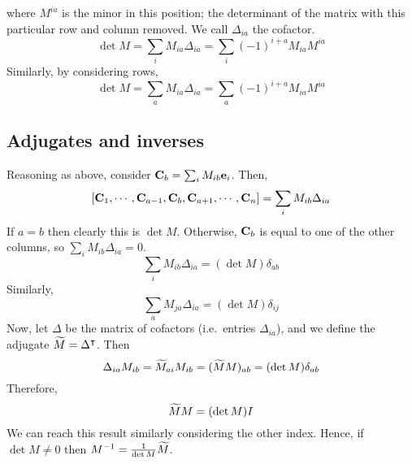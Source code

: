 where \(M^{ia}\) is the minor in this position; the determinant of the matrix with this particular row and column removed.
We call \(\Delta_{ia}\) the cofactor.
\[
	\det M = \sum_i M_{ia} \Delta_{ia} = \sum_i(-1)^{i+a}M_{ia}M^{ia}
\]
Similarly, by considering rows,
\[
	\det M = \sum_a M_{ia} \Delta_{ia} = \sum_a(-1)^{i+a}M_{ia}M^{ia}
\]

\subsection{Adjugates and inverses}
Reasoning as above, consider \(\vb C_b = \sum_i M_{ib} \vb e_i\).
Then,
\[
	[\vb C_1, \cdots, \vb C_{a-1}, \vb C_b, \vb C_{a+1}, \cdots, \vb C_n ] = \sum_i M_{ib} \Delta_{ia}
\]
If \(a=b\) then clearly this is \(\det M\).
Otherwise, \(\vb C_b\) is equal to one of the other columns, so \(\sum_i M_{ib} \Delta_{ia} = 0\).
\[
	\sum_i M_{ib} \Delta_{ia} = (\det M)\delta_{ab}
\]
Similarly,
\[
	\sum_a M_{ja} \Delta_{ia} = (\det M)\delta_{ij}
\]
Now, let \(\Delta\) be the matrix of cofactors (i.e.\ entries \(\Delta_{ia}\)), and we define the adjugate \(\widetilde{M} = \Delta^\intercal\).
Then
\[
	\Delta_{ia}M_{ib} = \widetilde{M}_{ai}M_{ib} = (\widetilde{M} M)_{ab} = (\det M)\delta_{ab}
\]
Therefore,
\[
	\widetilde{M} M = (\det M) I
\]
We can reach this result similarly considering the other index.
Hence, if \(\det M \neq 0\) then \(M^{-1} = \frac{1}{\det M}\widetilde{M}\).
